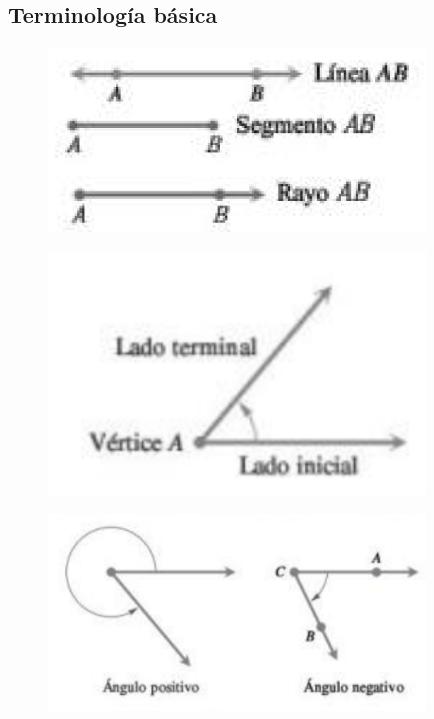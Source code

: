 \subsection{Terminología básica}
{}
	\begin{figure}[h]
		\centering
		\includegraphics[width=10cm,keepaspectratio=true]{./trig/trig_101-1.png}
		\label{fig:101-1}
	\end{figure}
	

{}
	\begin{figure}[h]
		\centering
		\includegraphics[width=10cm,keepaspectratio=true]{./trig/trig_101-2.png}
		\label{fig:101-2}
	\end{figure}
	

{}
	\begin{figure}[h]
		\centering
		\includegraphics[width=10cm,keepaspectratio=true]{./trig/trig_101-3.png}
		\label{fig:101-3}
	\end{figure}
	

